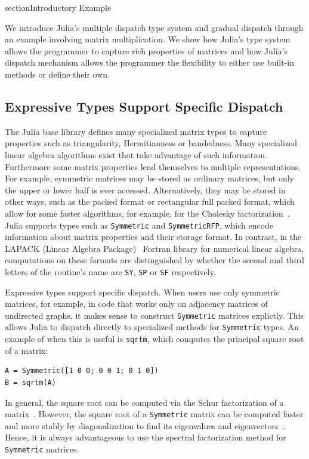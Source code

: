 section{Introductory Example}

We introduce Julia's multiple dispatch type system and gradual dispatch through an example involving matrix multiplication. We show how Julia's type system allows the programmer to capture rich properties of matrices and how Julia's dispatch mechanism allows the programmer the flexibility to either use built-in methods or define their own.

\subsection{Expressive Types Support Specific Dispatch}
The Julia base library defines
many specialized matrix types to capture properties
such as triangularity, Hermitianness or bandedness. Many specialized
linear algebra algorithms exist that take advantage of such information.
Furthermore some matrix properties lend themselves to multiple representations.
For example, symmetric matrices may be stored as ordinary matrices, but only
the upper or lower half is ever accessed. Alternatively, they may be stored in
other ways, such as the packed format or rectangular full packed format, which
allow for some faster algorithms, for example, for the Cholesky
factorization~\cite{Gustavson2010}.
Julia supports types such as \lstinline|Symmetric| and \lstinline|SymmetricRFP|, which encode information about matrix properties and their storage format.
In contrast, in the LAPACK (Linear Algebra Package)~ Fortran library for numerical linear algebra, computations
on these formats are distinguished by whether the second and third letters of
the routine's name are \lstinline|SY|, \lstinline|SP| or \lstinline|SF|
respectively.

Expressive types support specific dispatch.
When users use only symmetric matrices, for example, in code that
works only on adjacency matrices of undirected graphs,
it makes sense to construct \lstinline|Symmetric| matrices explictly.
This allows Julia to dispatch directly to specialized methods for \lstinline|Symmetric|
types. An example of when this is useful is \lstinline|sqrtm|, which computes the
principal square root of a matrix:
\begin{lstlisting}
A = Symmetric([1 0 0; 0 0 1; 0 1 0])
B = sqrtm(A)
\end{lstlisting}
In general, the square root can be computed
via the Schur factorization of a matrix~\cite{Golub2013}. However, the square
root of a \lstinline|Symmetric| matrix can be computed faster and more stably
by diagonalization to find its eigenvalues and
eigenvectors~\cite{Higham2008,Golub2013}. Hence, it is always advantageous to
use the spectral factorization method for \lstinline|Symmetric| matrices.

